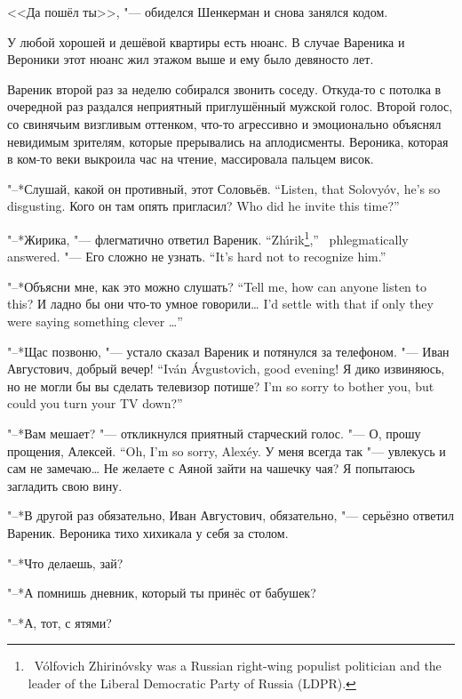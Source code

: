 <<Да пошёл ты>>, "--- обиделся Шенкерман и снова занялся кодом.

\asterism

У любой хорошей и дешёвой квартиры есть нюанс.
В случае Вареника и Вероники этот нюанс жил этажом выше и ему было девяносто лет.

Вареник второй раз за неделю собирался звонить соседу.
Откуда-то с потолка в очередной раз раздался неприятный приглушённый мужской голос.
Второй голос, со свинячьим визгливым оттенком, что-то агрессивно и эмоционально объяснял невидимым зрителям, которые прерывались на аплодисменты.
Вероника, которая в ком-то веки выкроила час на чтение, массировала пальцем висок.

{"--*Слушай, какой он противный, этот Соловьёв.}
{``Listen, that Solovy\'ov, he's so disgusting.}
{Кого он там опять пригласил?}
{Who did he invite this time?''}

{"--*Жирика, "--- флегматично ответил Вареник.}
{``Zh\'{\i}rik\footnote{\Vladimir\ V\'olfovich Zhirin\'ovsky was a Russian right-wing populist politician and the leader of the Liberal Democratic Party of Russia (LDPR).},'' \Varenik\ phlegmatically answered.}
{"--- Его сложно не узнать.}
{``It's hard not to recognize him.''}

{"--*Объясни мне, как это можно слушать?}
{``Tell me, how can anyone listen to this?}
{И ладно бы они что-то умное говорили\ldots{}}
{I'd settle with that if only they were saying something clever \ldots{}''}

"--*Щас позвоню, "--- устало сказал Вареник и потянулся за телефоном.
{"--- Иван Августович, добрый вечер!}
{``Iv\'an \'Avgustovich, good evening!}
{Я дико извиняюсь, но не могли бы вы сделать телевизор потише?}
{I'm so sorry to bother you, but could you turn your TV down?''}

"--*Вам мешает? "--- откликнулся приятный старческий голос.
{"--- О, прошу прощения, Алексей.}
{``Oh, I'm so sorry, Alex\'ey.}
У меня всегда так "--- увлекусь и сам не замечаю\ldots{}
Не желаете с Аяной зайти на чашечку чая?
Я попытаюсь загладить свою вину.

"--*В другой раз обязательно, Иван Августович, обязательно, "--- серьёзно ответил Вареник.
Вероника тихо хихикала у себя за столом.

"--*Что делаешь, зай?

"--*А помнишь дневник, который ты принёс от бабушек?

"--*А, тот, с ятями?

